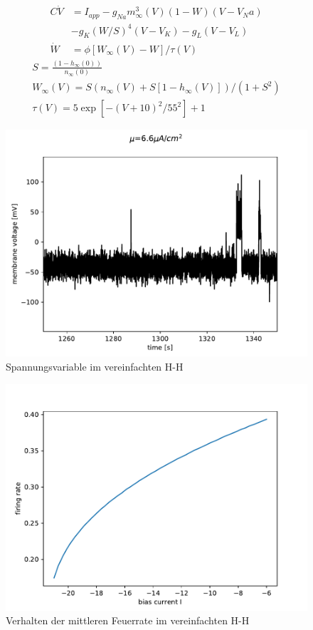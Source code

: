 \documentclass[12pt,a4paper]{article}
\begin{document}
\begin{align*}
C\dot{V}&=I_{app}-g_{Na}m_\infty^3(V)(1-W)(V-V_Na)\\
&-g_K(W/S)^4(V-V_K)-g_L(V-V_L)\\
\dot{W}&=\phi\left[W_\infty(V)-W\right]/\tau(V)
\end{align*}
\begin{align*}
S=\frac{(1-h_\infty(0))}{n_\infty(0)}\\
W_\infty(V)=S\left(n_\infty(V)+S\left[1-h_\infty(V)\right]\right)/(1+S^2)\\
\tau(V)=5\exp[-(V+10)^2/55^2 ]+1
\end{align*}
\begin{figure}[H]
	\centering
	\includegraphics[scale=1]{realstaterinzel.pdf}\caption{Spannungsvariable im vereinfachten H-H}
	\label{rinzelvolt}
\end{figure}
\begin{figure}[H]
	\centering
	\includegraphics[scale=1]{detmocountrinzel.pdf}\caption{Verhalten der mittleren Feuerrate im vereinfachten H-H}
	\label{rinzelcount}
\end{figure}
\end{document}
